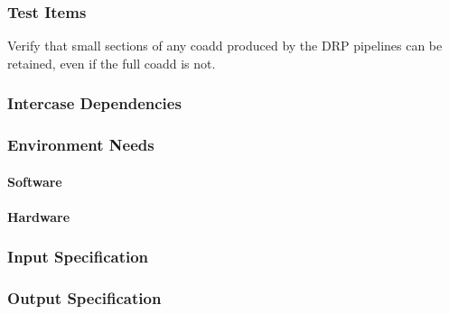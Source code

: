 \subsubsection{Test Items}
Verify that small sections of any coadd produced by the DRP pipelines
can be retained, even if the full coadd is not.



\subsubsection{Intercase Dependencies}

\subsubsection{Environment Needs}

\paragraph{Software}

\paragraph{Hardware}

\subsubsection{Input Specification}

\subsubsection{Output Specification}

